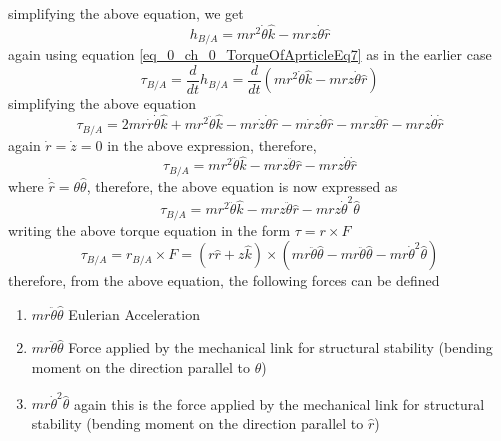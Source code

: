 simplifying the above equation, we get
\begin{equation}
	h_{B/A} = m r^{2} \dot{\theta} \hat{k} - m r z \dot{\theta} \hat{r}
\end{equation}
again using equation \eqref{eq_0_ch_0_TorqueOfAprticleEq7} as in the earlier case
\begin{equation}
\tau_{B/A} = \frac{d}{dt} h_{B/A} = \frac{d}{dt} \left( m r^{2} \dot{\theta} \hat{k} - m r z \dot{\theta} \hat{r} \right)
\end{equation}
simplifying the above equation
\begin{equation}
	\tau_{B/A} = 2 m r \dot{r} \dot{\theta} \hat{k} + m r^{2} \ddot{\theta} \hat{k} - m r \dot{z} \dot{\theta} \hat{r} - m \dot{r} z \dot{\theta} \hat{r} - m r z \ddot{\theta} \hat{r} - m r z \dot{\theta} \dot{\hat{r}}
\end{equation}
again $\dot{r} = \dot{z} = 0$ in the above expression, therefore,
\begin{equation}
	\tau_{B/A} = m r^{2} \ddot{\theta} \hat{k} - m r z \ddot{\theta} \hat{r} - m r z \dot{\theta} \dot{\hat{r}}
\end{equation}
where $\dot{\hat{r}} = \theta \hat{\theta}$, therefore, the above equation is now expressed as
\begin{equation}
\tau_{B/A} = m r^{2} \ddot{\theta} \hat{k} - m r z \ddot{\theta} \hat{r} - m r z \dot{\theta}^2 \hat{\theta}
\end{equation}
writing the above torque equation in the form $\tau = r \times F$
\begin{equation}
\tau_{B/A} = r_{B/A} \times F = \left(r \hat{r} + z \hat{k} \right) \times \left( m r \ddot{\theta} \hat{\theta} - m r \ddot{\theta} \hat{\theta} - m r \dot{\theta}^{2} \hat{\theta} \right)
\end{equation}
therefore, from the above equation, the following forces can be defined
\begin{enumerate}
	\item $m r \ddot{\theta} \hat{\theta}$ Eulerian Acceleration
	\item $m r \ddot{\theta} \hat{\theta}$ Force applied by the mechanical link for structural stability (bending moment on the direction parallel to $\hat{\theta}$)
	\item $m r \dot{\theta}^{2} \hat{\theta}$ again this is the force applied by the mechanical link for structural stability (bending moment on the direction parallel to $\hat{r}$)
\end{enumerate}

